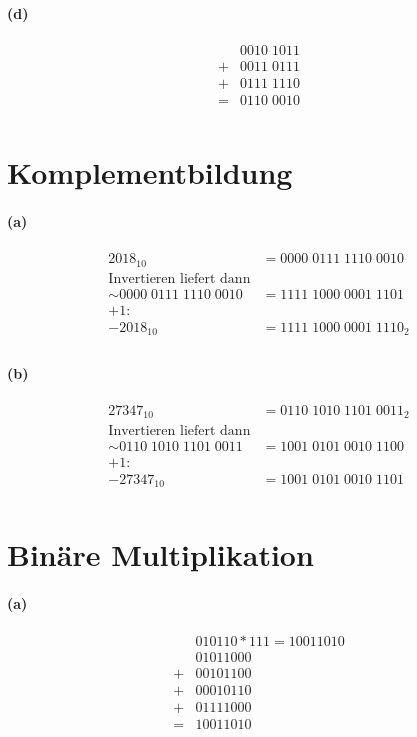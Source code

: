 \documentclass[a4paper]{article}
\begin{document}
\paragraph{(d)}
\begin{align*}
    &0010\;1011\\
    +&0011\;0111\\
    +&0111\;1110\\
    =&0110\;0010\\
\end{align*}


\section{Komplementbildung}
\paragraph{(a)}
\begin{align*}
    2018_{10}&=0000\;0111\;1110\;0010\\
    \text{Invertieren liefert dann}\\
    \sim0000\;0111\;1110\;0010 &= 1111\;1000\;0001\;1101\\
    \text{+1:}\\
    -2018_{10} &= 1111\;1000\;0001\;1110_2\\
\end{align*}

\paragraph{(b)}
\begin{align*}
    27347_{10}&=0110\;1010\;1101\;0011_2\\
    \text{Invertieren liefert dann}\\
    \sim0110\;1010\;1101\;0011 &= 1001\;0101\;0010\;1100\\
    \text{+1:}\\
    -27347_{10} &= 1001\;0101\;0010\;1101\\
\end{align*}

\section{Binäre Multiplikation}
\paragraph{(a)}
\begin{align*}
    &010110*111=10011010\\
    &01011000\\
    +&00101100\\
    +&00010110\\
    +&01111000\\
    =&10011010\\
\end{align*}
\end{document}
